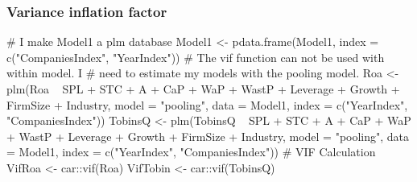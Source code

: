 \documentclass[12pt,]{article}
\newenvironment{Shaded}{}{}
\newcommand{\KeywordTok}[1]{\textcolor[rgb]{0.00,0.00,1.00}{#1}}
\newcommand{\DataTypeTok}[1]{#1}
\newcommand{\StringTok}[1]{\textcolor[rgb]{0.00,0.50,0.50}{#1}}
\newcommand{\CommentTok}[1]{\textcolor[rgb]{0.00,0.50,0.00}{#1}}
\newcommand{\OperatorTok}[1]{#1}
\newcommand{\NormalTok}[1]{#1}
\begin{document}
\subsubsection*{Variance inflation
factor}\label{variance-inflation-factor}

\begin{Shaded}
\begin{Highlighting}[]
\CommentTok{# I make Model1 a plm database}
\NormalTok{Model1 <-}\StringTok{ }\KeywordTok{pdata.frame}\NormalTok{(Model1, }\DataTypeTok{index =} \KeywordTok{c}\NormalTok{(}\StringTok{"CompaniesIndex"}\NormalTok{, }
    \StringTok{"YearIndex"}\NormalTok{))}
\CommentTok{# The vif function can not be used with within model. I}
\CommentTok{# need to estimate my models with the pooling model.}
\NormalTok{Roa <-}\StringTok{ }\KeywordTok{plm}\NormalTok{(Roa }\OperatorTok{~}\StringTok{ }\NormalTok{SPL }\OperatorTok{+}\StringTok{ }\NormalTok{STC }\OperatorTok{+}\StringTok{ }\NormalTok{A }\OperatorTok{+}\StringTok{ }\NormalTok{CaP }\OperatorTok{+}\StringTok{ }\NormalTok{WaP }\OperatorTok{+}\StringTok{ }\NormalTok{WastP }\OperatorTok{+}\StringTok{ }\NormalTok{Leverage }\OperatorTok{+}\StringTok{ }
\StringTok{    }\NormalTok{Growth }\OperatorTok{+}\StringTok{ }\NormalTok{FirmSize }\OperatorTok{+}\StringTok{ }\NormalTok{Industry, }\DataTypeTok{model =} \StringTok{"pooling"}\NormalTok{, }\DataTypeTok{data =}\NormalTok{ Model1, }
    \DataTypeTok{index =} \KeywordTok{c}\NormalTok{(}\StringTok{"YearIndex"}\NormalTok{, }\StringTok{"CompaniesIndex"}\NormalTok{))}
\NormalTok{TobinsQ <-}\StringTok{ }\KeywordTok{plm}\NormalTok{(TobinsQ }\OperatorTok{~}\StringTok{ }\NormalTok{SPL }\OperatorTok{+}\StringTok{ }\NormalTok{STC }\OperatorTok{+}\StringTok{ }\NormalTok{A }\OperatorTok{+}\StringTok{ }\NormalTok{CaP }\OperatorTok{+}\StringTok{ }\NormalTok{WaP }\OperatorTok{+}\StringTok{ }\NormalTok{WastP }\OperatorTok{+}\StringTok{ }
\StringTok{    }\NormalTok{Leverage }\OperatorTok{+}\StringTok{ }\NormalTok{Growth }\OperatorTok{+}\StringTok{ }\NormalTok{FirmSize }\OperatorTok{+}\StringTok{ }\NormalTok{Industry, }\DataTypeTok{model =} \StringTok{"pooling"}\NormalTok{, }
    \DataTypeTok{data =}\NormalTok{ Model1, }\DataTypeTok{index =} \KeywordTok{c}\NormalTok{(}\StringTok{"YearIndex"}\NormalTok{, }\StringTok{"CompaniesIndex"}\NormalTok{))}
\CommentTok{# VIF Calculation}
\NormalTok{VifRoa <-}\StringTok{ }\NormalTok{car}\OperatorTok{::}\KeywordTok{vif}\NormalTok{(Roa)}
\NormalTok{VifTobin <-}\StringTok{ }\NormalTok{car}\OperatorTok{::}\KeywordTok{vif}\NormalTok{(TobinsQ)}

\end{Highlighting}
\end{Shaded}
\end{document}
